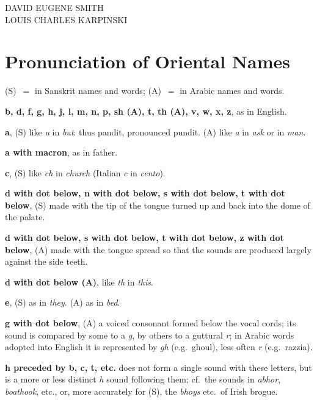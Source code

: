 \documentclass[11pt,a4paper]{article}
\begin{document}
\begin{flushright}
DAVID EUGENE SMITH\\
LOUIS CHARLES KARPINSKI
\end{flushright}

\newpage

\tableofcontents
\newpage

\section*{Pronunciation of Oriental Names}

(S)~$=$ in Sanskrit names and words; (A)~$=$ in Arabic names and words.

\medskip
\noindent\textbf{b, d, f, g, h, j, l, m, n, p, sh (A), t, th (A), v, w, x, z}, as in English.

\smallskip
\noindent\textbf{a}, (S) like \textit{u} in \textit{but}: thus pandit, pronounced pundit. (A) like \textit{a} in \textit{ask} or in \textit{man}.

\smallskip
\noindent\textbf{a with macron}, as in father.

\smallskip
\noindent\textbf{c}, (S) like \textit{ch} in \textit{church} (Italian \textit{c} in \textit{cento}).

\smallskip
\noindent\textbf{d with dot below, n with dot below, s with dot below, t with dot below}, (S) made with the tip of the tongue turned up and back into the dome of the palate.

\smallskip
\noindent\textbf{d with dot below, s with dot below, t with dot below, z with dot below}, (A) made with the tongue spread so that the sounds are produced largely against the side teeth.

\smallskip
\noindent\textbf{d with dot below (A)}, like \textit{th} in \textit{this}.

\smallskip
\noindent\textbf{e}, (S) as in \textit{they}. (A) as in \textit{bed}.

\smallskip
\noindent\textbf{g with dot below}, (A) a voiced consonant formed below the vocal cords; its sound is compared by some to a \textit{g}, by others to a guttural \textit{r}; in Arabic words adopted into English it is represented by \textit{gh} (e.g.\ ghoul), less often \textit{r} (e.g.\ razzia).

\smallskip
\noindent\textbf{h preceded by b, c, t, etc.} does not form a single sound with these letters, but is a more or less distinct \textit{h} sound following them; cf.\ the sounds in \textit{abhor}, \textit{boathook}, etc., or, more accurately for (S), the \textit{bhoys} etc.\ of Irish brogue.
\end{document}
